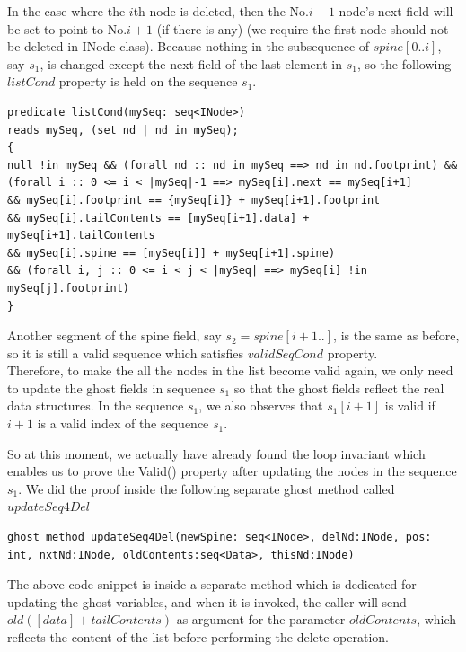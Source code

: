 \bigskip
In the case where the $i$th node is deleted, then the No.$i-1$ node's next field will be set to point to No.$i+1$ (if there is any) (we require the first node should not be deleted in INode class). Because nothing in the subsequence of $spine[0..i]$, say $s_1$, is changed except the next field of the last element in $s_1$, so the following $listCond$ property is held on the sequence $s_1$. 

\begin{lstlisting}
predicate listCond(mySeq: seq<INode>)
reads mySeq, (set nd | nd in mySeq);
{
null !in mySeq && (forall nd :: nd in mySeq ==> nd in nd.footprint) &&
(forall i :: 0 <= i < |mySeq|-1 ==> mySeq[i].next == mySeq[i+1]
&& mySeq[i].footprint == {mySeq[i]} + mySeq[i+1].footprint
&& mySeq[i].tailContents == [mySeq[i+1].data] + mySeq[i+1].tailContents
&& mySeq[i].spine == [mySeq[i]] + mySeq[i+1].spine)
&& (forall i, j :: 0 <= i < j < |mySeq| ==> mySeq[i] !in mySeq[j].footprint)
}
\end{lstlisting}

\bigskip

Another segment of the spine field, say $s_2 = spine[i+1..]$, is the same as before, so it is still a valid sequence which satisfies $validSeqCond$ property.\\

Therefore, to make the all the nodes in the list become valid again, we only need to update the ghost fields in sequence $s_1$ so that the ghost fields reflect the real data structures. In the sequence $s_1$, we also observes that $s_1[i+1]$ is valid if $i+1$ is a valid index of the sequence $s_1$.

\bigskip

So at this moment, we actually have already found the loop invariant which enables us to prove the Valid() property after updating the nodes in the sequence $s_1$. We did the proof inside the following separate ghost method called $updateSeq4Del$\\

\begin{lstlisting}
ghost method updateSeq4Del(newSpine: seq<INode>, delNd:INode, pos: int, nxtNd:INode, oldContents:seq<Data>, thisNd:INode)
\end{lstlisting}


The above code snippet is inside a separate method which is dedicated for updating the ghost variables, and when it is invoked, the caller will send $old([data] + tailContents)$ as argument for the parameter $oldContents$, which reflects the content of the list before performing the delete operation.\\


